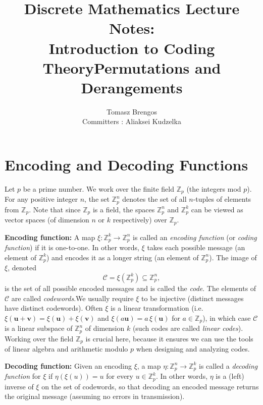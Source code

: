 \documentclass[docmute]{article}
\title{Discrete Mathematics Lecture Notes:\\Introduction to Coding Theory}
\author{}
\date{}
\title{Permutations and Derangements}
\author{Tomasz Brengos \\  
Committers : Aliaksei Kudzelka}
\date{}
\begin{document}
\maketitle


\section{Encoding and Decoding Functions}

Let $p$ be a prime number. We work over the finite field $\mathbb{Z}_p$ (the integers mod $p$). For any positive integer $n$, the set $\mathbb{Z}_p^n$ denotes the set of all $n$-tuples of elements from $\mathbb{Z}_p$. Note that since $\mathbb{Z}_p$ is a field, the spaces $\mathbb{Z}_p^n$ and $\mathbb{Z}_p^k$ can be viewed as vector spaces (of dimension $n$ or $k$ respectively) over $\mathbb{Z}_p$.

\medskip

\noindent \textbf{Encoding function:} A map $\xi: \mathbb{Z}_p^k \to \mathbb{Z}_p^n$ is called an \emph{encoding function} (or \emph{coding function}) if it is one-to-one. In other words, $\xi$ takes each possible message (an element of $\mathbb{Z}_p^k$) and encodes it as a longer string (an element of $\mathbb{Z}_p^n$). The image of $\xi$, denoted 
\[ \mathcal{C} = \xi(\mathbb{Z}_p^k) \subseteq \mathbb{Z}_p^n, \] 
is the set of all possible encoded messages and is called the \emph{code}. The elements of $\mathcal{C}$ are called \emph{codewords}.We usually require $\xi$ to be injective (distinct messages have distinct codewords). Often $\xi$ is a linear transformation (i.e. $\xi(\mathbf{u}+\mathbf{v})=\xi(\mathbf{u})+\xi(\mathbf{v})$ and $\xi(a\mathbf{u})=a\,\xi(\mathbf{u})$ for $a\in \mathbb{Z}_p$), in which case $\mathcal{C}$ is a linear subspace of $\mathbb{Z}_p^n$ of dimension $k$ (such codes are called \emph{linear codes}). Working over the field $\mathbb{Z}_p$ is crucial here, because it ensures we can use the tools of linear algebra and arithmetic modulo $p$ when designing and analyzing codes.

\medskip

\noindent \textbf{Decoding function:} Given an encoding $\xi$, a map $\eta: \mathbb{Z}_p^n \to \mathbb{Z}_p^k$ is called a \emph{decoding function} for $\xi$ if $\eta(\xi(u)) = u$ for every $u \in \mathbb{Z}_p^k$. In other words, $\eta$ is a (left) inverse of $\xi$ on the set of codewords, so that decoding an encoded message returns the original message (assuming no errors in transmission).

\medskip
\end{document}
